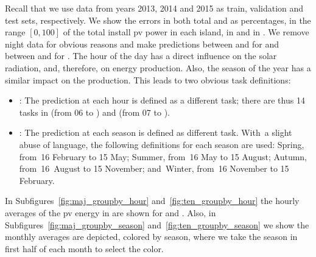 %
Recall that we use data from years 2013, 2014 and 2015 as train, validation and test sets, respectively.
%
We show the errors in both total \mwhu{} and as percentages, in the range $[0, 100]$ of the total install \acrshort{pv} power in each island, {} in  and  in .
%
We remove night data for obvious reasons and make predictions between  and  {for}  and between  and  for .
%
The hour of the day has a direct influence on the solar radiation, and, therefore, on energy production. Also, the season of the year has a similar impact on the production. This leads to two obvious task definitions:
\begin{itemize}
    \item	{}: The prediction at each hour is defined as a different task; there are thus 14 tasks in  (from 06 to ) and  (from 07 to ).
    \item	{}: The prediction at each season is defined as different task.  With~a slight abuse of language, the following definitions for each season are used: Spring, from~16 February to 15 May; Summer, from~16 May to 15 August; Autumn, from~16~August to 15 November; and~Winter, from~16 November to 15 February.
\end{itemize}
%
In Subfigures~\ref{fig:maj_groupby_hour} and~\ref{fig:ten_groupby_hour} the hourly averages of the \acrshort{pv} energy in \mwhu{} are shown for  and .
Also, in Subfigures~\ref{fig:maj_groupby_season} and~\ref{fig:ten_groupby_season} we show the monthly averages are depicted, colored by season, where we take the season in first half of each month to select the color.
